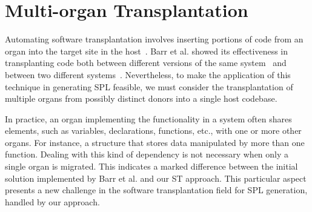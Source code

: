 \section{Multi-organ Transplantation}\label{sec:background}

Automating software transplantation involves inserting portions of code from an organ into the target site in the host~\cite{Barr2015}. Barr et al. showed its effectiveness in transplanting code both between different versions of the same system~\cite{Petke2014} and between two different systems~\cite{Barr2015}. Nevertheless, to make the application of this technique in generating SPL feasible, we must consider the transplantation of multiple organs from possibly distinct donors into a single host codebase.

In practice, an organ implementing the functionality in a system often shares elements, such as variables, declarations, functions, etc., with one or more other organs. For instance, a structure that stores data manipulated by more than one function. Dealing with this kind of dependency is not necessary when only a single organ is migrated. This indicates a marked difference between the initial solution implemented by Barr et al. and our ST approach. This particular aspect presents a new challenge in the software transplantation field for SPL generation, handled by our approach.
